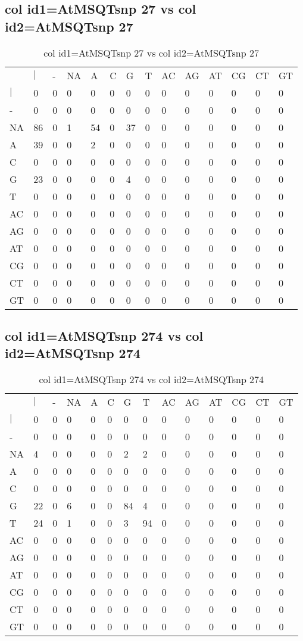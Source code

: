 \subsection{col id1=AtMSQTsnp 27 vs col id2=AtMSQTsnp 27}
\begin{center}
\begin{longtable}{|l|l|l|l|l|l|l|l|l|l|l|l|l|l|}
\caption{col id1=AtMSQTsnp 27 vs col id2=AtMSQTsnp 27} \label{table_dm620}\\
\hline
\\
\hline
&$|$&-&NA&A&C&G&T&AC&AG&AT&CG&CT&GT\\
$|$&0&0&0&0&0&0&0&0&0&0&0&0&0\\
-&0&0&0&0&0&0&0&0&0&0&0&0&0\\
NA&86&0&1&54&0&37&0&0&0&0&0&0&0\\
A&39&0&0&2&0&0&0&0&0&0&0&0&0\\
C&0&0&0&0&0&0&0&0&0&0&0&0&0\\
G&23&0&0&0&0&4&0&0&0&0&0&0&0\\
T&0&0&0&0&0&0&0&0&0&0&0&0&0\\
AC&0&0&0&0&0&0&0&0&0&0&0&0&0\\
AG&0&0&0&0&0&0&0&0&0&0&0&0&0\\
AT&0&0&0&0&0&0&0&0&0&0&0&0&0\\
CG&0&0&0&0&0&0&0&0&0&0&0&0&0\\
CT&0&0&0&0&0&0&0&0&0&0&0&0&0\\
GT&0&0&0&0&0&0&0&0&0&0&0&0&0\\
\hline
\end{longtable}
\end{center}

\subsection{col id1=AtMSQTsnp 274 vs col id2=AtMSQTsnp 274}
\begin{center}
\begin{longtable}{|l|l|l|l|l|l|l|l|l|l|l|l|l|l|}
\caption{col id1=AtMSQTsnp 274 vs col id2=AtMSQTsnp 274} \label{table_dm622}\\
\hline
\\
\hline
&$|$&-&NA&A&C&G&T&AC&AG&AT&CG&CT&GT\\
$|$&0&0&0&0&0&0&0&0&0&0&0&0&0\\
-&0&0&0&0&0&0&0&0&0&0&0&0&0\\
NA&4&0&0&0&0&2&2&0&0&0&0&0&0\\
A&0&0&0&0&0&0&0&0&0&0&0&0&0\\
C&0&0&0&0&0&0&0&0&0&0&0&0&0\\
G&22&0&6&0&0&84&4&0&0&0&0&0&0\\
T&24&0&1&0&0&3&94&0&0&0&0&0&0\\
AC&0&0&0&0&0&0&0&0&0&0&0&0&0\\
AG&0&0&0&0&0&0&0&0&0&0&0&0&0\\
AT&0&0&0&0&0&0&0&0&0&0&0&0&0\\
CG&0&0&0&0&0&0&0&0&0&0&0&0&0\\
CT&0&0&0&0&0&0&0&0&0&0&0&0&0\\
GT&0&0&0&0&0&0&0&0&0&0&0&0&0\\
\hline
\end{longtable}
\end{center}

